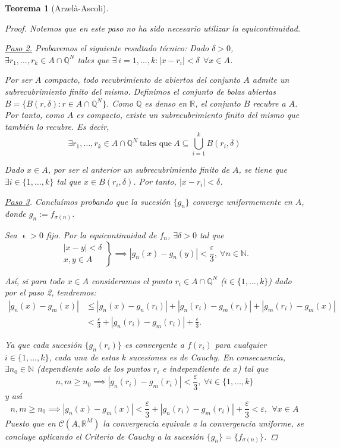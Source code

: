 \documentclass[11pt, a4paper]{article}
\let\epsilon\upvarepsilon
\theoremstyle{theorem-style}
\newtheorem{nth}{Teorema}[section]
\theoremstyle{definition-style}
\theoremstyle{remark-style}
\theoremstyle{example-style}
\begin{document}
\begin{nth}[Arzelà-Ascoli]
\begin{proof}
    Notemos que en este paso no ha sido necesario utilizar la equicontinuidad.

    \underline{Paso 2.} Probaremos el siguiente resultado técnico: Dado $\delta>0$, $\exists r_1,...,r_k \in A \cap \mathbb Q^N$ tales que $\exists \ i=1,...,k : |x-r_i| < \delta \ \ \forall x \in A$.

    Por ser $A$ compacto, todo recubrimiento de abiertos del conjunto $A$ admite un subrecubrimiento finito del mismo. Definimos el conjunto de bolas abiertas $B=\{B(r,\delta) : r \in A\cap \mathbb Q^N \}$. Como $\mathbb{Q}$ es denso en $\mathbb{R}$, el conjunto $B$ recubre a $A$. Por tanto, como $A$ es compacto, existe un subrecubrimiento finito del mismo que también lo recubre. Es decir, $$\exists r_1,\dots, r_k \in A\cap \mathbb Q^N \ \text{tales que} \ A \subseteq \bigcup_{i=1}^k B(r_i,\delta)$$
    
    Dado $x \in A$, por ser el anterior un subrecubrimiento finito de $A$, se tiene que\\ $\exists i \in \{1,\dots,k\}$ tal que $x \in B(r_i,\delta)$. Por tanto, $|x-r_i| <\delta$.

    \underline{Paso 3}. Concluímos probando que la sucesión $\{g_n\}$ converge uniformemente en $A$, donde $g_n := f_{\sigma(n)}$.

    Sea $\epsilon>0$ fijo. Por la equicontinuidad de $f_n$, 
    $\exists\delta>0$ tal que
    \[
      \left.
        \begin{array}{c}
          |x-y| <\delta
          \\
          x,y\in A
        \end{array}
      \right\}
      \implies |g_n(x)-g_n(y)|<\frac{\varepsilon}{3} , \ \forall n\in\mathbb N.
    \]

    Así, si para todo $x\in A$ consideramos el punto  $r_i\in A\cap \mathbb Q^N$ ($i \in \{1,\dots,k\}$) dado por el paso 2, tendremos:
    \[
      \begin{aligned}
        |g_n(x)-g_m(x)| &\leq |g_n(x)-g_n(r_i)| + |g_n(r_i)-g_m(r_i)|+|g_m(r_i)-g_m(x)|
        \\
        &<\frac{\varepsilon}{3} +|g_n(r_i)-g_m(r_i)| 
        + \frac{\varepsilon}{3} .
      \end{aligned}
    \]



    Ya que cada sucesi\'on $\{ g_n(r_i)\}$ es convergente a $f(r_i)$ para cualquier $i\in \{ 1,\dots ,k\}$, cada una de estas $k$ sucesiones  es de Cauchy. En consecuencia, $\exists n_0\in\mathbb N$ ({dependiente solo de los puntos $r_i$ e independiente de $x$}) tal que
    \[
      n,m\geq n_0 \implies |g_n(r_i)-g_m(r_i)| <\frac{\varepsilon}{3} , \ \forall i\in \{ 1,\dots ,k\}
    \]
    y as\'{\i}
    \[
      n,m\geq n_0 \implies |g_n(x)-g_m(x)| <\frac{\varepsilon}{3} +|g_n(r_i)-g_m(r_i)| 
      + \frac{\varepsilon}{3} <\varepsilon , \ \ \forall x\in A
    \]
    Puesto que en $\mathcal{C}(A,\mathbb R^M )$ la convergencia equivale a la convergencia uniforme, se concluye aplicando el \textit{Criterio de Cauchy} a la sucesión $\{g_n\} = \{f_{\sigma(n)}\}$.
  \end{proof}
  
\end{nth}
\end{document}
